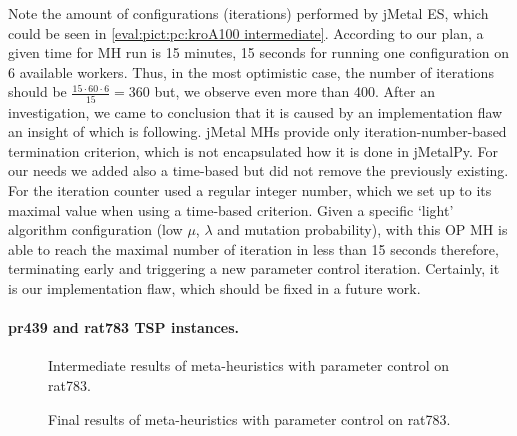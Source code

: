 Note the amount of configurations (iterations) performed by jMetal ES, which could be seen in \cref{eval:pict:pc:kroA100 intermediate}. According to our plan, a given time for MH run is 15 minutes, 15 seconds for running one configuration on 6 available workers. Thus, in the most optimistic case, the number of iterations should be $ \frac{15\cdot60\cdot6}{15} = 360$ but, we observe even more than 400. After an investigation, we came to conclusion that it is caused by an implementation flaw an insight of which is following. jMetal MHs provide only iteration-number-based termination criterion, which is not encapsulated how it is done in jMetalPy. For our needs we added also a time-based but did not remove the previously existing. For the iteration counter used a regular integer number, which we set up to its maximal value when using a time-based criterion. Given a specific `light' algorithm configuration (low $\mu$, $\lambda$ and mutation probability), with this OP MH is able to reach the maximal number of iteration in less than 15 seconds therefore, terminating early and triggering a new parameter control iteration. Certainly, it is our implementation flaw, which should be fixed in a future work.



\paragraph{pr439 and rat783 TSP instances.}
\begin{figure}[t]
	\centering
	\vspace{-20pt}
	
	\caption{Intermediate results of meta-heuristics with parameter control on rat783.}
	\vspace{-5pt}
	\label{eval:pict:pc:rat783 intermediate}
\end{figure}
\begin{figure}[b]
	\centering
	\vspace{-20pt}
	
	\caption{Final results of meta-heuristics with parameter control on rat783.}
	\vspace{-5pt}
	\label{eval:pict:pc:rat783 final}
\end{figure}

